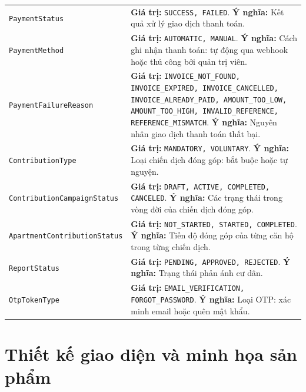﻿\documentclass[12pt,a4paper]{report}
\begin{document}
\begin{longtable}{L{4.9cm} L{9.5cm}}
\texttt{PaymentStatus} & \textbf{Giá trị:} \texttt{SUCCESS, FAILED}. \newline \textbf{Ý nghĩa:} Kết quả xử lý giao dịch thanh toán. \\
\texttt{PaymentMethod} & \textbf{Giá trị:} \texttt{AUTOMATIC, MANUAL}. \newline \textbf{Ý nghĩa:} Cách ghi nhận thanh toán: tự động qua webhook hoặc thủ công bởi quản trị viên. \\
\texttt{Payment}\newline\texttt{FailureReason} & \textbf{Giá trị:} \texttt{INVOICE\_NOT\_FOUND, INVOICE\_EXPIRED, INVOICE\_CANCELLED, INVOICE\_ALREADY\_PAID, AMOUNT\_TOO\_LOW, AMOUNT\_TOO\_HIGH, INVALID\_REFERENCE, REFERENCE\_MISMATCH}. \newline \textbf{Ý nghĩa:} Nguyên nhân giao dịch thanh toán thất bại. \\
\texttt{ContributionType} & \textbf{Giá trị:} \texttt{MANDATORY, VOLUNTARY}. \newline \textbf{Ý nghĩa:} Loại chiến dịch đóng góp: bắt buộc hoặc tự nguyện. \\
\texttt{Contribution}\newline\texttt{CampaignStatus} & \textbf{Giá trị:} \texttt{DRAFT, ACTIVE, COMPLETED, CANCELED}. \newline \textbf{Ý nghĩa:} Các trạng thái trong vòng đời của chiến dịch đóng góp. \\
\texttt{Apartment}\newline\texttt{ContributionStatus} & \textbf{Giá trị:} \texttt{NOT\_STARTED, STARTED, COMPLETED}. \newline \textbf{Ý nghĩa:} Tiến độ đóng góp của từng căn hộ trong từng chiến dịch. \\
\texttt{ReportStatus} & \textbf{Giá trị:} \texttt{PENDING, APPROVED, REJECTED}. \newline \textbf{Ý nghĩa:} Trạng thái phản ánh cư dân. \\
\texttt{OtpTokenType} & \textbf{Giá trị:} \texttt{EMAIL\_VERIFICATION, FORGOT\_PASSWORD}. \newline \textbf{Ý nghĩa:} Loại OTP: xác minh email hoặc quên mật khẩu. \\
\bottomrule
\end{longtable}
\endgroup

\chapter{Thiết kế giao diện và minh họa sản phẩm}
\end{document}
